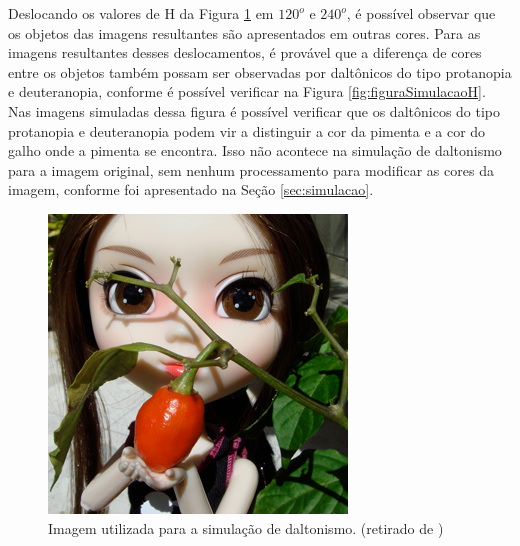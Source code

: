 \documentclass[	12pt, Times, openright, twoside, a4paper, english, brazil]{abntex2}
\begin{document}
Deslocando os valores de H da Figura \ref{fig:figuraPimentaOriginal} em $120^o$ e $240^o$, é possível observar que os objetos das imagens resultantes são apresentados em outras cores. Para as imagens resultantes desses deslocamentos, é provável que a diferença de cores entre os objetos também possam ser observadas por daltônicos do tipo protanopia e deuteranopia, conforme é possível verificar na Figura  \ref{fig:figuraSimulacaoH}. Nas imagens simuladas dessa figura é possível verificar que os daltônicos do tipo protanopia e deuteranopia podem vir a distinguir a cor da pimenta e a cor do galho onde a pimenta se encontra. Isso não acontece na simulação de daltonismo para a imagem original, sem nenhum processamento para modificar as cores da imagem, conforme foi apresentado na Seção \ref{sec:simulacao}.

\begin{figure}[!htb]
\centering \includegraphics[width=0.35\linewidth]{figuraSimuladorOriginal.png}
\caption{Imagem utilizada para a simulação de daltonismo. (retirado de  )}
\label{fig:figuraPimentaOriginal}
\end{figure}
\end{document}
